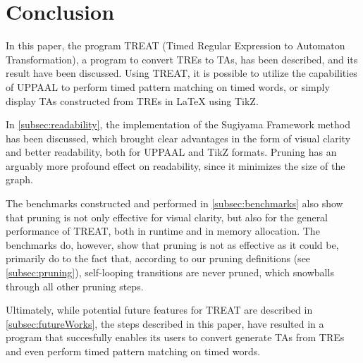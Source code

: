 \section{Conclusion}


In this paper, the program TREAT (Timed Regular Expression to Automaton Transformation), a program to convert TREs to TAs, has been described, and its result have been discussed. Using TREAT, it is possible to utilize the capabilities of UPPAAL to perform timed pattern matching on timed words, or simply display TAs constructed from TREs in LaTeX using TikZ.

In \cref{subsec:readability}, the implementation of the Sugiyama Framework method has been discussed, which brought clear advantages in the form of visual clarity and better readability, both for UPPAAL and TikZ formats. Pruning has an arguably more profound effect on readability, since it minimizes the size of the graph.

The benchmarks constructed and performed in \cref{subsec:benchmarks} also show that pruning is not only effective for visual clarity, but also for the general performance of TREAT, both in runtime and in memory allocation. The benchmarks do, however, show that pruning is not as effective as it could be, primarily do to the fact that, according to our pruning definitions (see \cref{subsec:pruning}), self-looping transitions are never pruned, which snowballs through all other pruning steps.

Ultimately, while potential future features for TREAT are described in \cref{subsec:futureWorks}, the steps described in this paper, have resulted in a program that succesfully enables its users to convert generate TAs from TREs and even perform timed pattern matching on timed words.
